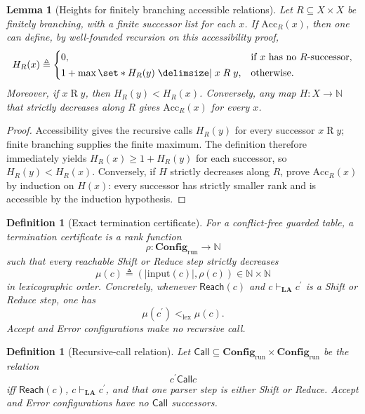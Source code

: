 \documentclass[11pt,a4paper]{article}
\theoremstyle{prettyplain}
\newtheorem{lemma}[theorem]{Lemma}
\theoremstyle{prettydef}
\newtheorem{definition}[theorem]{Definition}
\def\mid{\;\delimsize\vert\;}#1%
\newcommand{\Look}{\mathbf{LA}}
\newcommand{\Config}{\mathbf{Config}}
\begin{document}
\begin{lemma}[Heights for finitely branching accessible relations]
\label{lem:finitely-branching-height}
Let \(R\subseteq X\times X\) be finitely branching, with a finite successor list
for each \(x\).  If \(\mathrm{Acc}_R(x)\), then one can define, by well-founded
recursion on this accessibility proof,
\[
H_R(x)
\triangleq
\begin{cases}
0,&\text{if }x\text{ has no }R\text{-successor},\\[2pt]
1+\max\set*{H_R(y)\mid x\mathrel R y},&\text{otherwise.}
\end{cases}
\]
Moreover, if \(x\mathrel R y\), then \(H_R(y)<H_R(x)\).  Conversely, any map
\(H:X\to\mathbb N\) that strictly decreases along \(R\) gives
\(\mathrm{Acc}_R(x)\) for every \(x\).
\end{lemma}

\begin{proof}
Accessibility gives the recursive calls \(H_R(y)\) for every successor
\(x\mathrel R y\); finite branching supplies the finite maximum.  The definition
therefore immediately yields \(H_R(x)\ge 1+H_R(y)\) for each successor, so
\(H_R(y)<H_R(x)\).  Conversely, if \(H\) strictly decreases along \(R\), prove
\(\mathrm{Acc}_R(x)\) by induction on \(H(x)\): every successor has strictly
smaller rank and is accessible by the induction hypothesis.
\end{proof}

\begin{definition}[Exact termination certificate]\label{def:termination-cert}
For a conflict-free guarded table, a termination certificate is a rank function
\[
\rho:\Config_{\mathrm{run}}\to\mathbb N
\]
such that every reachable Shift or Reduce step strictly decreases
\[
\mu(c)\triangleq(|\mathrm{input}(c)|,\rho(c))\in\mathbb N\times\mathbb N
\]
in lexicographic order.  Concretely, whenever \(\mathsf{Reach}(c)\) and
\(c\vdash_{\Look}c^\prime\) is a Shift or Reduce step, one has
\[
\mu(c^\prime)<_{\mathrm{lex}}\mu(c).
\]
Accept and Error configurations make no recursive call.
\end{definition}

\begin{definition}[Recursive-call relation]\label{def:recursive-call-relation}
Let \(\mathsf{Call}\subseteq\Config_{\mathrm{run}}\times\Config_{\mathrm{run}}\) be the relation
\[
c^\prime\mathrel{\mathsf{Call}}c
\]
iff \(\mathsf{Reach}(c)\), \(c\vdash_{\Look}c^\prime\), and that one parser step is either
Shift or Reduce.  Accept and Error configurations have no \(\mathsf{Call}\)
successors.
\end{definition}
\end{document}
